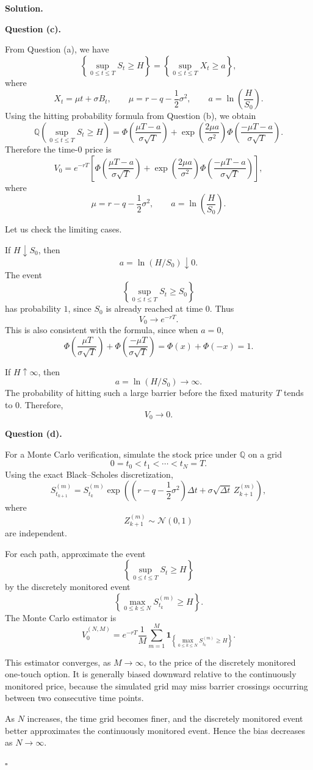\documentclass[11pt]{article}
\theoremstyle{plain}
\newcommand{\1}{\mathbf{1}}
\theoremstyle{definition}
\newenvironment{solution}
{\par\medskip\noindent\textbf{Solution.}\par\medskip}
{\hfill$\square$\par\medskip}
\newenvironment{solutionpart}[1]
{\par\medskip\noindent\textbf{#1.}\par\smallskip}
{\par\medskip}
\begin{document}
\begin{solution}
\begin{solutionpart}{Question (c)}
From Question (a), we have
\[
\left\{\sup_{0\le t\le T}S_t\ge H\right\}
=
\left\{\sup_{0\le t\le T}X_t\ge a\right\},
\]
where
\[
X_t=\mu t+\sigma B_t,
\qquad
\mu=r-q-\frac12\sigma^2,
\qquad
a=\ln\left(\frac{H}{S_0}\right).
\]
Using the hitting probability formula from Question (b), we obtain
\[
\mathbb{Q}\left(\sup_{0\le t\le T}S_t\ge H\right)
=
\Phi\left(\frac{\mu T-a}{\sigma\sqrt T}\right)
+
\exp\left(\frac{2\mu a}{\sigma^2}\right)
\Phi\left(\frac{-\mu T-a}{\sigma\sqrt T}\right).
\]
Therefore the time-$0$ price is
\[
\boxed{
V_0
=
e^{-rT}
\left[
\Phi\left(\frac{\mu T-a}{\sigma\sqrt T}\right)
+
\exp\left(\frac{2\mu a}{\sigma^2}\right)
\Phi\left(\frac{-\mu T-a}{\sigma\sqrt T}\right)
\right],
}
\]
where
\[
\mu=r-q-\frac12\sigma^2,
\qquad
a=\ln\left(\frac{H}{S_0}\right).
\]

Let us check the limiting cases.

If $H\downarrow S_0$, then
\[
a=\ln(H/S_0)\downarrow0.
\]
The event
\[
\left\{\sup_{0\le t\le T}S_t\ge S_0\right\}
\]
has probability $1$, since $S_0$ is already reached at time $0$. Thus
\[
V_0\to e^{-rT}.
\]
This is also consistent with the formula, since when $a=0$,
\[
\Phi\left(\frac{\mu T}{\sigma\sqrt T}\right)
+
\Phi\left(\frac{-\mu T}{\sigma\sqrt T}\right)
=
\Phi(x)+\Phi(-x)=1.
\]

If $H\uparrow\infty$, then
\[
a=\ln(H/S_0)\to\infty.
\]
The probability of hitting such a large barrier before the fixed maturity $T$ tends to $0$.
Therefore,
\[
V_0\to0.
\]
\end{solutionpart}

\begin{solutionpart}{Question (d)}
For a Monte Carlo verification, simulate the stock price under $\mathbb{Q}$ on a grid
\[
0=t_0<t_1<\cdots<t_N=T.
\]
Using the exact Black--Scholes discretization,
\[
S_{t_{k+1}}^{(m)}
=
S_{t_k}^{(m)}
\exp\left(
\left(r-q-\frac12\sigma^2\right)\Delta t
+
\sigma\sqrt{\Delta t}\,Z_{k+1}^{(m)}
\right),
\]
where
\[
Z_{k+1}^{(m)}\sim\mathcal N(0,1)
\]
are independent.

For each path, approximate the event
\[
\left\{\sup_{0\le t\le T}S_t\ge H\right\}
\]
by the discretely monitored event
\[
\left\{\max_{0\le k\le N}S_{t_k}^{(m)}\ge H\right\}.
\]
The Monte Carlo estimator is
\[
\boxed{
\widehat V_0^{(N,M)}
=
e^{-rT}\frac1M
\sum_{m=1}^M
\mathbf 1_{\left\{\max_{0\le k\le N}S_{t_k}^{(m)}\ge H\right\}}.
}
\]

This estimator converges, as $M\to\infty$, to the price of the discretely monitored one-touch option. It is generally biased downward relative to the continuously monitored price, because the simulated grid may miss barrier crossings occurring between two consecutive time points.

As $N$ increases, the time grid becomes finer, and the discretely monitored event better approximates the continuously monitored event. Hence the bias decreases as $N\to\infty$.
\end{solutionpart}
\end{solution}
\end{document}
